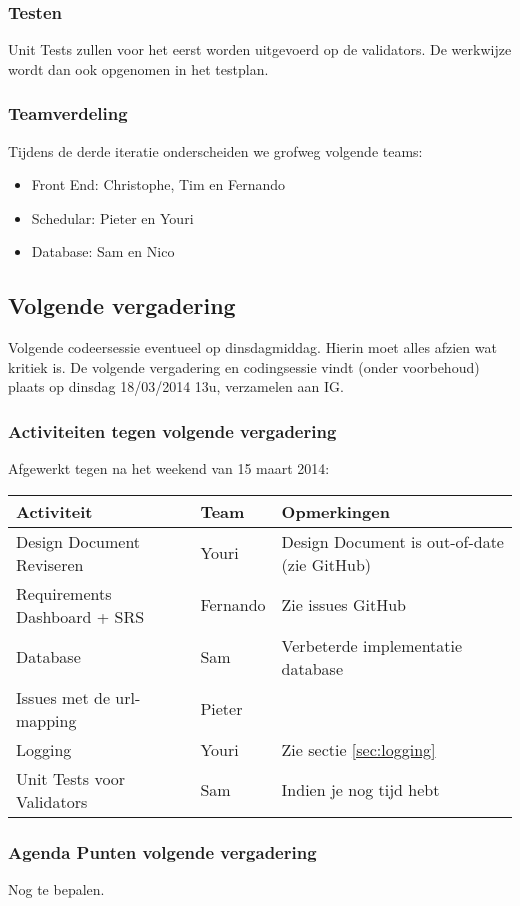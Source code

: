 \subsubsection{Testen}
Unit Tests zullen voor het eerst worden uitgevoerd op de validators. De werkwijze wordt dan ook opgenomen in het testplan.

\subsubsection{Teamverdeling}
Tijdens de derde iteratie onderscheiden we grofweg volgende teams:
\begin{itemize}
	\item Front End: Christophe, Tim en Fernando
	\item Schedular: Pieter en Youri
	\item Database: Sam en Nico
\end{itemize}

\subsection{Volgende vergadering}
Volgende codeersessie eventueel op dinsdagmiddag. Hierin moet alles afzien wat kritiek is.
De volgende vergadering en codingsessie vindt (onder voorbehoud) plaats op dinsdag 18/03/2014 13u, verzamelen aan IG.
\subsubsection{Activiteiten tegen volgende vergadering} \label{sec:TODOActiviteiten}
Afgewerkt tegen na het weekend van 15 maart 2014:
\begin{table} [H]
	\centering
	\begin{tabular} {l|l|l}
		\textbf{Activiteit} & \textbf{Team} & \textbf{Opmerkingen} \\
		\hline
		Design Document Reviseren & Youri & Design Document is out-of-date (zie GitHub) \\
		Requirements Dashboard + SRS & Fernando & Zie issues GitHub \\
		Database & Sam & Verbeterde implementatie database \\
		Issues met de url-mapping & Pieter & \\
		Logging & Youri & Zie sectie \ref{sec:logging} \\
		Unit Tests voor Validators & Sam & Indien je nog tijd hebt \\
	\end{tabular}
\end{table}

\subsubsection{Agenda Punten volgende vergadering}
Nog te bepalen.